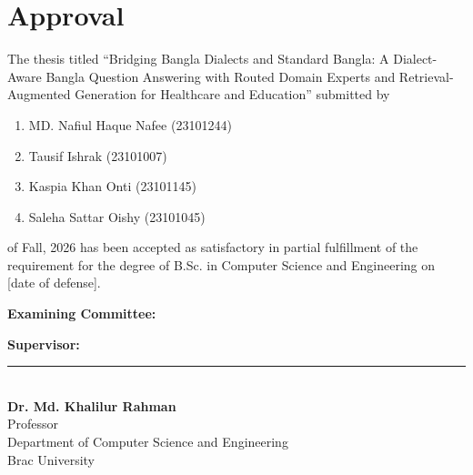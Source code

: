 \section*{Approval}

The thesis titled ``Bridging Bangla Dialects and Standard Bangla: A Dialect-Aware Bangla Question Answering with Routed Domain Experts and Retrieval-Augmented Generation for Healthcare and Education'' submitted by

\begin{enumerate}
    \item MD. Nafiul Haque Nafee (23101244)
    \item Tausif Ishrak (23101007)
    \item Kaspia Khan Onti (23101145)
    \item Saleha Sattar Oishy (23101045)
\end{enumerate}

of Fall, 2026 has been accepted as satisfactory in partial fulfillment of the requirement for the degree of B.Sc. in Computer Science and Engineering on [date of defense].

\vspace{0.5cm}

\textbf{Examining Committee:}

\vspace{0.5cm}


\noindent
\begin{minipage}[t]{0.33\textwidth}\raggedright
    \textbf{Supervisor:}\\
\end{minipage}
\hfill
\begin{minipage}[t]{0.62\textwidth}
    \centering

    \vspace{1.0cm}

    \rule{6.5cm}{0.4pt}\\
    \textbf{Dr. Md. Khalilur Rahman}\\
    Professor\\
    Department of Computer Science and Engineering\\
    Brac University
\end{minipage}

\vspace{0.8cm}



